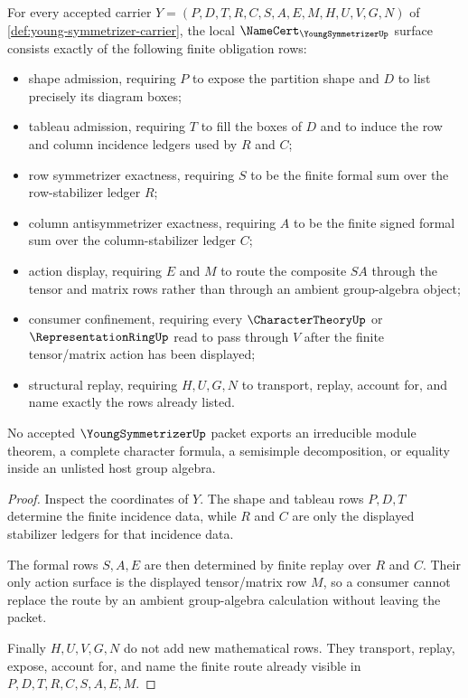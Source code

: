 \begin{theorem}\label{thm:young-symmetrizer-namecert-obligations}
For every accepted carrier $Y=(P,D,T,R,C,S,A,E,M,H,U,V,G,N)$ of \autoref{def:young-symmetrizer-carrier}, the local $\NameCert_{\YoungSymmetrizerUp}$ surface consists exactly of the following finite obligation rows:
\begin{itemize}
\item shape admission, requiring $P$ to expose the partition shape and $D$ to list precisely its diagram boxes;
\item tableau admission, requiring $T$ to fill the boxes of $D$ and to induce the row and column incidence ledgers used by $R$ and $C$;
\item row symmetrizer exactness, requiring $S$ to be the finite formal sum over the row-stabilizer ledger $R$;
\item column antisymmetrizer exactness, requiring $A$ to be the finite signed formal sum over the column-stabilizer ledger $C$;
\item action display, requiring $E$ and $M$ to route the composite $S A$ through the tensor and matrix rows rather than through an ambient group-algebra object;
\item consumer confinement, requiring every $\CharacterTheoryUp$ or $\RepresentationRingUp$ read to pass through $V$ after the finite tensor/matrix action has been displayed;
\item structural replay, requiring $H,U,G,N$ to transport, replay, account for, and name exactly the rows already listed.
\end{itemize}
No accepted $\YoungSymmetrizerUp$ packet exports an irreducible module theorem, a complete character formula, a semisimple decomposition, or equality inside an unlisted host group algebra.
\end{theorem}

\begin{proof}
Inspect the coordinates of $Y$. The shape and tableau rows $P,D,T$ determine the finite incidence data, while $R$ and $C$ are only the displayed stabilizer ledgers for that incidence data.

The formal rows $S,A,E$ are then determined by finite replay over $R$ and $C$. Their only action surface is the displayed tensor/matrix row $M$, so a consumer cannot replace the route by an ambient group-algebra calculation without leaving the packet.

Finally $H,U,V,G,N$ do not add new mathematical rows. They transport, replay, expose, account for, and name the finite route already visible in $P,D,T,R,C,S,A,E,M$.
\end{proof}

